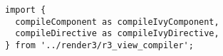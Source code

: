 \begin{verbatim}
import {
  compileComponent as compileIvyComponent,
  compileDirective as compileIvyDirective,
} from '../render3/r3_view_compiler';
\end{verbatim}
